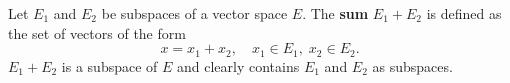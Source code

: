 Let $E_1$ and $E_2$ be subspaces of a vector space $E$. The \textbf{sum} $E_1 + E_2$ is defined as the set of vectors of the form
$$x = x_1 + x_2, \quad x_1 \in E_1, \; x_2 \in E_2.$$
$E_1 + E_2$ is a subspace of $E$ and clearly contains $E_1$ and $E_2$ as subspaces.
